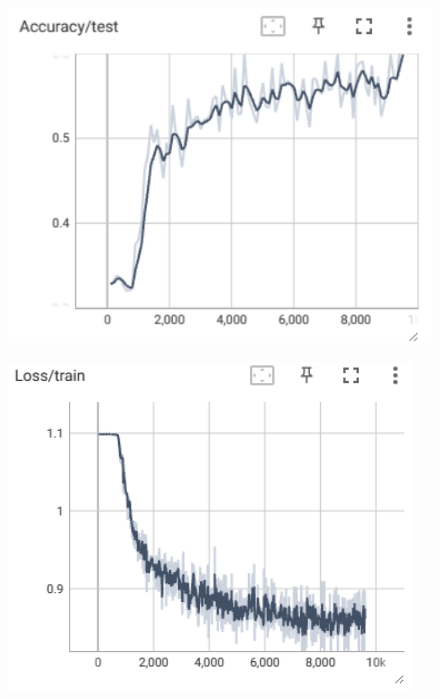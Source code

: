 \documentclass[12pt]{article}
\begin{document}
\begin{enumerate}[label=\alph*]
\begin{figure}[htbp]
	\centering
	\begin{minipage}{0.4\linewidth}
		\centering
		\includegraphics[width=0.9\linewidth]{./figures/3w1s8_acc.png}
		\label{pic one}%
	\end{minipage}
	\begin{minipage}{0.4\linewidth}
		\centering
		\includegraphics[width=0.9\linewidth]{./figures/3w1s8_train_loss.png}
		\label{pic two}%
	\end{minipage}
	\begin{minipage}{0.4\linewidth}
		\centering

\end{minipage}
\end{figure}
\end{enumerate}
\end{document}
